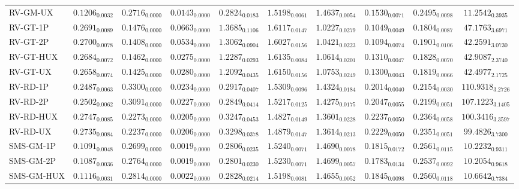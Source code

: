 \begin{longtable}{@{}lccccccccc@{}}
RV-GM-UX & $0.1206_{0.0032}$ & $0.2716_{0.0000}$ & $0.0143_{0.0000}$ & $0.2824_{0.0183}$ & $1.5198_{0.0061}$ & $1.4637_{0.0054}$ & $0.1530_{0.0071}$ & $0.2495_{0.0098}$ & $11.2542_{0.3935}$ \\
RV-GT-1P & $0.2691_{0.0089}$ & $0.1476_{0.0000}$ & $0.0663_{0.0000}$ & $1.3685_{0.1106}$ & $1.6117_{0.0147}$ & $1.0227_{0.0279}$ & $0.1049_{0.0049}$ & $0.1804_{0.0087}$ & $47.1763_{3.6971}$ \\
RV-GT-2P & $0.2700_{0.0078}$ & $0.1408_{0.0000}$ & $0.0534_{0.0000}$ & $1.3062_{0.0904}$ & $1.6027_{0.0156}$ & $1.0421_{0.0223}$ & $0.1094_{0.0074}$ & $0.1901_{0.0106}$ & $42.2591_{3.0730}$ \\
RV-GT-HUX & $0.2684_{0.0072}$ & $0.1462_{0.0000}$ & $0.0275_{0.0000}$ & $1.2287_{0.0293}$ & $1.6135_{0.0084}$ & $1.0614_{0.0201}$ & $0.1310_{0.0047}$ & $0.1828_{0.0070}$ & $42.9087_{2.3740}$ \\
RV-GT-UX & $0.2658_{0.0074}$ & $0.1425_{0.0000}$ & $0.0280_{0.0000}$ & $1.2092_{0.0435}$ & $1.6150_{0.0156}$ & $1.0753_{0.0249}$ & $0.1300_{0.0043}$ & $0.1819_{0.0066}$ & $42.4977_{2.1725}$ \\
RV-RD-1P & $0.2487_{0.0063}$ & $0.3300_{0.0000}$ & $0.0234_{0.0000}$ & $0.2917_{0.0407}$ & $1.5309_{0.0096}$ & $1.4324_{0.0184}$ & $0.2014_{0.0040}$ & $0.2154_{0.0030}$ & $110.9318_{3.2726}$ \\
RV-RD-2P & $0.2502_{0.0062}$ & $0.3091_{0.0000}$ & $0.0227_{0.0000}$ & $0.2849_{0.0414}$ & $1.5217_{0.0125}$ & $1.4275_{0.0175}$ & $0.2047_{0.0055}$ & $0.2199_{0.0051}$ & $107.1223_{3.1405}$ \\
RV-RD-HUX & $0.2747_{0.0085}$ & $0.2273_{0.0000}$ & $0.0205_{0.0000}$ & $0.3247_{0.0453}$ & $1.4827_{0.0149}$ & $1.3601_{0.0228}$ & $0.2237_{0.0050}$ & $0.2364_{0.0058}$ & $100.3416_{3.3597}$ \\
RV-RD-UX & $0.2735_{0.0084}$ & $0.2237_{0.0000}$ & $0.0206_{0.0000}$ & $0.3298_{0.0378}$ & $1.4879_{0.0147}$ & $1.3614_{0.0213}$ & $0.2229_{0.0050}$ & $0.2351_{0.0051}$ & $99.4826_{3.7300}$ \\
SMS-GM-1P & $0.1091_{0.0048}$ & $0.2699_{0.0000}$ & $\mathbf{0.0019}_{0.0000}$ & $0.2806_{0.0235}$ & $1.5240_{0.0071}$ & $1.4690_{0.0078}$ & $0.1815_{0.0172}$ & $0.2561_{0.0115}$ & $10.2232_{0.9311}$ \\
SMS-GM-2P & $0.1087_{0.0036}$ & $0.2764_{0.0000}$ & $\mathbf{0.0019}_{0.0000}$ & $0.2801_{0.0230}$ & $1.5230_{0.0071}$ & $1.4699_{0.0057}$ & $0.1783_{0.0134}$ & $0.2537_{0.0092}$ & $10.2054_{0.9618}$ \\
SMS-GM-HUX & $0.1116_{0.0031}$ & $0.2814_{0.0000}$ & $\mathbf{0.0022}_{0.0000}$ & $0.2828_{0.0214}$ & $1.5198_{0.0081}$ & $1.4655_{0.0052}$ & $0.1845_{0.0098}$ & $0.2560_{0.0118}$ & $10.6642_{0.7384}$ \\

\end{longtable}
